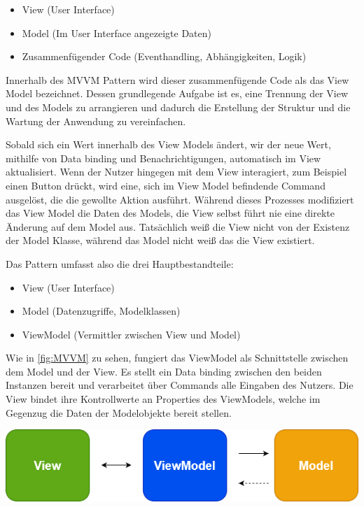 \begin{itemize}
 	\item View (User Interface)
 	\item Model (Im User Interface angezeigte Daten)
	\item Zusammenfügender Code (Eventhandling, Abhängigkeiten, Logik)
\end{itemize}

Innerhalb des MVVM Pattern wird dieser zusammenfügende Code als das View Model bezeichnet.
Dessen grundlegende Aufgabe ist es, eine Trennung der View und des Models zu arrangieren und dadurch die Erstellung der Struktur und die Wartung der Anwendung zu vereinfachen.

Sobald sich ein Wert innerhalb des View Models ändert, wir der neue Wert, mithilfe von Data binding und Benachrichtigungen, automatisch im View aktualisiert.
Wenn der Nutzer hingegen mit dem View interagiert, zum Beispiel einen Button drückt, wird eine, sich im View Model befindende Command ausgelöst, die die gewollte Aktion ausführt.
Während dieses Prozesses modifiziert das View Model die Daten des Models, die View selbst führt nie eine direkte Änderung auf dem Model aus.
Tatsächlich weiß die View nicht von der Existenz der Model Klasse, während das Model nicht weiß das die View existiert.

Das Pattern umfasst also die drei Hauptbestandteile:
\begin{itemize}
 	\item View (User Interface)
 	\item Model (Datenzugriffe, Modelklassen)
	\item ViewModel (Vermittler zwischen View und Model)
\end{itemize}

Wie in \cref{fig:MVVM} zu sehen, fungiert das ViewModel als Schnittstelle zwischen dem Model und der View. Es stellt ein Data binding zwischen den beiden Instanzen bereit und verarbeitet über Commands alle Eingaben des Nutzers.
Die View bindet ihre Kontrollwerte an Properties des ViewModels, welche im Gegenzug die Daten der Modelobjekte bereit stellen.

\begin{center}
  \includegraphics[scale=0.6]{figures/MVVM.PNG}
  \label{fig:MVVM}
\end{center}

